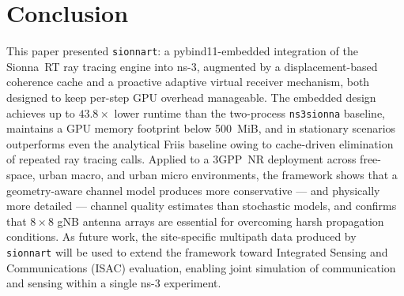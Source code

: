 \section{Conclusion}
\label{sec:conclusion}

This paper presented \texttt{sionnart}: a pybind11-embedded integration of the Sionna~RT ray tracing engine into ns-3, augmented by a displacement-based coherence cache and a proactive adaptive virtual receiver mechanism, both designed to keep per-step GPU overhead manageable.
The embedded design achieves up to $43.8\times$ lower runtime than the two-process \texttt{ns3sionna} baseline, maintains a GPU memory footprint below 500~MiB, and in stationary scenarios outperforms even the analytical Friis baseline owing to cache-driven elimination of repeated ray tracing calls.
Applied to a 3GPP~NR deployment across free-space, urban macro, and urban micro environments, the framework shows that a geometry-aware channel model produces more conservative — and physically more detailed — channel quality estimates than stochastic models, and confirms that $8\times8$ gNB antenna arrays are essential for overcoming harsh propagation conditions.
As future work, the site-specific multipath data produced by \texttt{sionnart} will be used to extend the framework toward Integrated Sensing and Communications (ISAC) evaluation, enabling joint simulation of communication and sensing within a single ns-3 experiment.